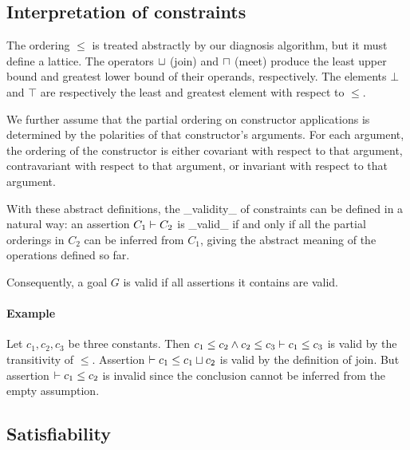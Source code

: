 
\subsection{Interpretation of constraints}

The ordering $\leq$ is treated abstractly by our diagnosis algorithm,
but it must define a lattice. The operators $\sqcup$ (join) and $\sqcap$
(meet) produce the least upper bound and greatest lower bound
of their operands, respectively.
%
The elements $\bot$ and $\top$ are respectively the least and greatest
element with respect to $\leq$.

We further assume that the partial ordering on constructor applications
is determined by the polarities of that constructor's arguments.
For each argument, the ordering of the constructor is either
covariant with respect to that argument, contravariant with respect
to that argument, or invariant with respect to that argument.

With these abstract definitions, the _validity_ of constraints can be defined
in a natural way: an assertion $C_1 \vdash C_2$ is _valid_ if and only if all
the partial orderings in $C_2$ can be inferred from $C_1$, giving the abstract
meaning of the operations defined so far.

Consequently, a goal $G$ is valid if all assertions it contains are valid.

\paragraph{Example}

Let $c_1, c_2, c_3$ be three constants. Then $c_1 \leq c_2 \land c_2 \leq c_3
\vdash c_1 \leq c_3$ is valid by the transitivity of $\leq$. Assertion $
\vdash c_1 \leq c_1 \sqcup c_2$ is valid by the definition of join. But
assertion $\vdash c_1\leq c_2$ is invalid since the
conclusion cannot be inferred from the empty assumption.

\subsection{Satisfiability}


